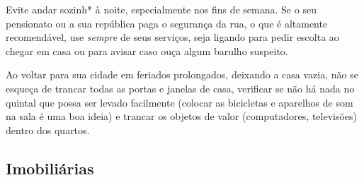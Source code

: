 Evite andar sozinh* à noite, especialmente nos fins de semana. Se o seu
pensionato ou a sua república paga o segurança da rua, o que é altamente
recomendável, use \emph{sempre} de seus serviços, seja ligando para pedir
escolta ao chegar em casa ou para avisar caso ouça algum barulho suspeito.

Ao voltar para sua cidade em feriados prolongados, deixando a casa vazia, não se
esqueça de trancar todas as portas e janelas de casa, verificar se não há nada
no quintal que possa ser levado facilmente (colocar as bicicletas e aparelhos de
som na sala é uma boa ideia) e trancar os objetos de valor (computadores,
televisões) dentro dos quartos.

\subsection{Imobiliárias}


